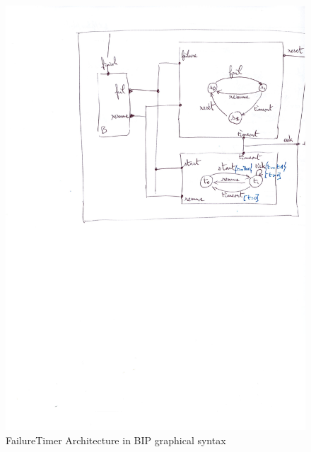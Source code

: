 \documentclass{lncs/llncs}
\begin{document}
 \begin{figure}[t]
   \centerline{\includegraphics[width=12cm]{XFIG/BIPspec-ArchFailureTimerMax}}
   \caption{FailureTimer Architecture in BIP graphical syntax}  \label{schema:BIParchitecture}
 \end{figure}
\end{document}
